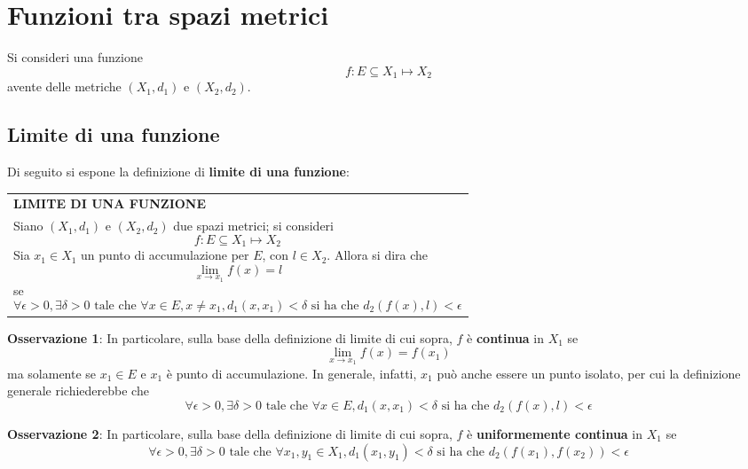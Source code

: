 \documentclass[a4paper]{extarticle}
\renewcommand\arraystretch{}
\begin{document}
\newpage
\section{Funzioni tra spazi metrici}
Si consideri una funzione
\[f : E \subseteq X_1 \longmapsto X_2\]
avente delle metriche $(X_1,d_1)$ e $(X_2,d_2)$.

\vspace{1em}
\noindent
\subsection{Limite di una funzione}
Di seguito si espone la definizione di \textbf{limite di una funzione}:

\vspace{1em}
\setlength{\tabcolsep}{14pt}
\renewcommand{\arraystretch}{2}
\noindent
\begin{tabularx}{\textwidth}{@{}|P|@{}}
    \hline
    {\textbf{LIMITE DI UNA FUNZIONE}}\\
    \parbox{\linewidth}{Siano $(X_1,d_1)$ e $(X_2,d_2)$ due spazi metrici; si consideri
    \[f : E \subseteq X_1 \longmapsto X_2\]
    Sia $x_1 \in X_1$ un punto di accumulazione per $E$, con $l \in X_2$. Allora si dira che
    \[\lim_{x \to x_1} f(x) = l\]
    se
    \[\forall \epsilon>0, \exists \delta>0 \text{ tale che } \forall x \in E, x \neq x_1, d_1(x,x_1) < \delta \text{ si ha che } d_2(f(x),l) < \epsilon\]
    \vspace{-1mm}}\\
    \hline
\end{tabularx}

\vspace{1em}
\noindent
\textbf{Osservazione 1}: In particolare, sulla base della definizione di limite di cui sopra, $f$ è \textbf{continua} in $X_1$ se
\[\lim_{x \to x_1} f(x) = f(x_1)\]
ma solamente se $x_1 \in E$ e $x_1$ è punto di accumulazione. In generale, infatti, $x_1$ può anche essere un punto isolato, per cui la definizione generale richiederebbe che
\[\forall \epsilon>0, \exists \delta>0 \text{ tale che } \forall x \in E, d_1(x,x_1) < \delta \text{ si ha che } d_2(f(x),l) < \epsilon\]

\vspace{1em}
\noindent
\textbf{Osservazione 2}: In particolare, sulla base della definizione di limite di cui sopra, $f$ è \textbf{uniformemente continua} in $X_1$ se
\[\forall \epsilon>0, \exists \delta>0 \text{ tale che } \forall x_1,y_1 \in X_1, d_1(x_1,y_1) < \delta \text{ si ha che } d_2(f(x_1),f(x_2)) < \epsilon\]
\end{document}
